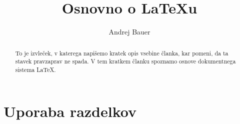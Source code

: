 \documentclass[a4paper]{article}
\begin{document}

\title{Osnovno o {\LaTeX}u}
\author{Andrej Bauer}


\maketitle


\begin{abstract}
  To je izvleček, v katerega napišemo kratek opis vsebine članka, kar pomeni, da ta stavek
  pravzaprav ne spada. V tem kratkem članku spoznamo osnove dokumentnega sistema {\LaTeX}.
\end{abstract}


\section{Uporaba razdelkov}

\end{document}
